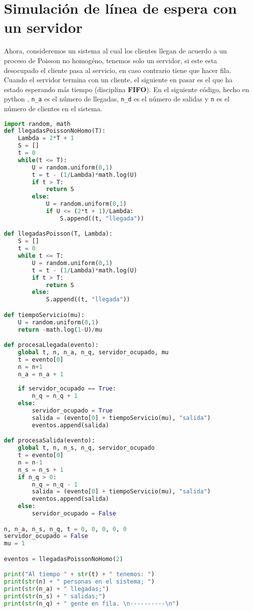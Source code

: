 \documentclass[12pt,letterpaper]{article}
\begin{document}
\section{Simulación de línea de espera con un servidor}
Ahora, consideremos un sistema al cual los clientes llegan de acuerdo a un proceso de Poisson no homogéno, tenemos solo un servidor, si este esta desocupado el cliente pasa al servicio, en caso contrario tiene que hacer fila. Cuando el servidor termina con un cliente, el siguiente en pasar es el que ha estado esperando más tiempo (disciplina \textbf{FIFO}).
En el siguiente código, hecho en python \cite{python}, \texttt{n\_a} es el número de llegadas, \texttt{n\_d} es el número de salidas y \texttt{n} es el número de clientes en el sistema.  
\begin{lstlisting}[language=python]
import random, math
def llegadasPoissonNoHomo(T):
    Lambda = 2*T + 1
    S = []
    t = 0
    while(t <= T):
        U = random.uniform(0,1)
        t = t - (1/Lambda)*math.log(U)
        if t > T:
            return S
        else:
            U = random.uniform(0,1)
            if U <= (2*t + 1)/Lambda:
                S.append((t, "llegada"))

def llegadasPoisson(T, Lambda):
    S = []
    t = 0
    while t <= T:
        U = random.uniform(0,1)
        t = t - (1/Lambda)*math.log(U)
        if t > T:
            return S
        else:
            S.append((t, "llegada"))

def tiempoServicio(mu):
    U = random.uniform(0,1)
    return -math.log(1-U)/mu

def procesaLlegada(evento):
    global t, n, n_a, n_q, servidor_ocupado, mu
    t = evento[0]
    n = n+1
    n_a = n_a + 1
    
    if servidor_ocupado == True:
        n_q = n_q + 1
    else:
        servidor_ocupado = True
        salida = (evento[0] + tiempoServicio(mu), "salida")
        eventos.append(salida)

def procesaSalida(evento):
    global t, n, n_s, n_q, servidor_ocupado
    t = evento[0]
    n = n-1
    n_s = n_s + 1
    if n_q > 0:
        n_q = n_q - 1
        salida = (evento[0] + tiempoServicio(mu), "salida")
        eventos.append(salida)
    else:
        servidor_ocupado = False

n, n_a, n_s, n_q, t = 0, 0, 0, 0, 0
servidor_ocupado = False
mu = 1

eventos = llegadasPoissonNoHomo(2)

print("Al tiempo " + str(t) + " tenemos: ")
print(str(n) + " personas en el sistema; ")
print(str(n_a) + " llegadas;")
print(str(n_s) + " salidas;")
print(str(n_q) + " gente en fila. \n----------\n")


\end{lstlisting}
\end{document}
